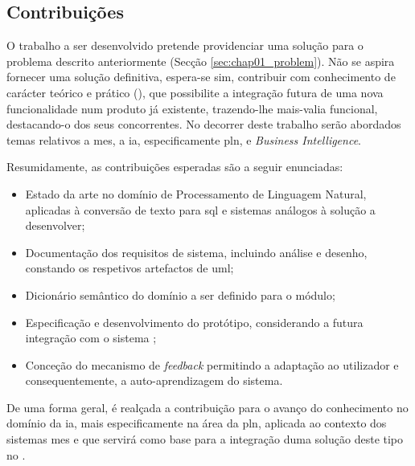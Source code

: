 \subsection{Contribuições}
\label{sec:chap01_contributions}

O trabalho a ser desenvolvido pretende providenciar uma solução para o problema descrito anteriormente (Secção \ref{sec:chap01_problem}). Não se aspira fornecer uma solução definitiva, espera-se sim, contribuir com conhecimento de carácter teórico e prático (), que possibilite a integração futura de uma nova funcionalidade num produto já existente, trazendo-lhe mais-valia funcional, destacando-o dos seus concorrentes. No decorrer deste trabalho serão abordados temas relativos a \gls{mes}, a \gls{ia}, especificamente \gls{pln}, e \textit{Business Intelligence}.

Resumidamente, as contribuições esperadas são a seguir enunciadas:

\begin{itemize}
    \item
    {
        Estado da arte no domínio de Processamento de Linguagem Natural, aplicadas à conversão de texto para \gls{sql} e sistemas análogos à solução a desenvolver;
    }
    \item 
    {
        Documentação dos requisitos de sistema, incluindo análise e desenho, constando os respetivos artefactos de \gls{uml};
    }
    \item 
    {
        Dicionário semântico do domínio a ser definido para o módulo;
    }
    \item
    {
        Especificação e desenvolvimento do protótipo, considerando a futura integração com o sistema {\productname};
    }
    \item
    {
        Conceção do mecanismo de \textit{feedback} permitindo a adaptação ao utilizador e consequentemente, a auto-aprendizagem do sistema.
    }
\end{itemize}

De uma forma geral, é realçada a contribuição para o avanço do conhecimento no domínio da \gls{ia}, mais especificamente na área da \gls{pln}, aplicada ao contexto dos sistemas \gls{mes} e que servirá como base para a integração duma solução deste tipo no {\productname}.